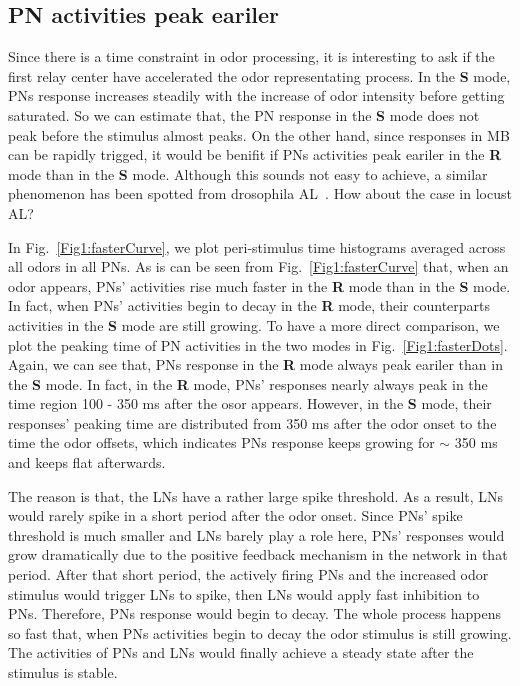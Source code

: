 \documentclass[12pt, a4paper]{article}
\begin{document}
\subsection{PN activities peak eariler}
Since there is a time constraint in odor processing, it is interesting to ask if the first relay center have accelerated the odor representating process. In the {\bf S} mode, PNs response increases steadily with the increase of odor intensity before getting saturated. So we can estimate that, the PN response in the {\bf S} mode does not peak before the stimulus almost peaks. On the other hand, since responses in MB can be rapidly trigged, it would be benifit if PNs activities peak eariler in the {\bf R} mode than in the {\bf S} mode. Although this sounds not easy to achieve, a similar phenomenon has been spotted from drosophila AL~\citep{}. How about the case in locust AL?

In Fig.~\ref{Fig1:fasterCurve}, we plot peri-stimulus time histograms averaged across all odors in all PNs. As is can be seen from Fig.~\ref{Fig1:fasterCurve} that, when an odor appears, PNs' activities rise much faster in the {\bf R} mode than in the {\bf S} mode. In fact, when PNs' activities begin to decay in the {\bf R} mode, their counterparts activities in the {\bf S} mode are still growing. %
To have a more direct comparison, we plot the peaking time of PN activities in the two modes in Fig.~\ref{Fig1:fasterDots}. Again, we can see that, PNs response in the {\bf R} mode always peak eariler than in the {\bf S} mode. In fact, in the {\bf R} mode, PNs' responses nearly always peak in the time region 100 - 350 ms after the osor appears. However, in the {\bf S} mode, their responses' peaking time are distributed from 350 ms after the odor onset to the time the odor offsets, which indicates PNs response keeps growing for $\sim$ 350 ms and keeps flat afterwards.

The reason is that, the LNs have a rather large spike threshold. As a result, LNs would rarely spike in a short period after the odor onset. Since PNs' spike threshold is much smaller and LNs barely play a role here, PNs' responses would grow dramatically due to the positive feedback mechanism in the network in that period. After that short period, the actively firing PNs and the increased odor stimulus would trigger LNs to spike, then LNs would apply fast inhibition to PNs. Therefore, PNs response would begin to decay. The whole process happens so fast that, when PNs activities begin to decay the odor stimulus is still growing. The activities of PNs and LNs would finally achieve a steady state after the stimulus is stable.
\end{document}
